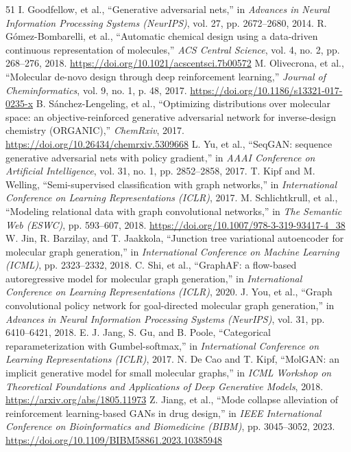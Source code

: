 \documentclass[10pt,a4paper]{article}
\begin{document}
\begin{thebibliography}{51}
 I. Goodfellow, et al., ``Generative adversarial nets,'' in \textit{Advances in Neural Information Processing Systems (NeurIPS)}, vol. 27, pp. 2672--2680, 2014.
 R. G\'omez-Bombarelli, et al., ``Automatic chemical design using a data-driven continuous representation of molecules,'' \textit{ACS Central Science}, vol. 4, no. 2, pp. 268--276, 2018. \url{https://doi.org/10.1021/acscentsci.7b00572}
 M. Olivecrona, et al., ``Molecular de-novo design through deep reinforcement learning,'' \textit{Journal of Cheminformatics}, vol. 9, no. 1, p. 48, 2017. \url{https://doi.org/10.1186/s13321-017-0235-x}
 B. S\'anchez-Lengeling, et al., ``Optimizing distributions over molecular space: an objective-reinforced generative adversarial network for inverse-design chemistry (ORGANIC),'' \textit{ChemRxiv}, 2017. \url{https://doi.org/10.26434/chemrxiv.5309668}
 L. Yu, et al., ``SeqGAN: sequence generative adversarial nets with policy gradient,'' in \textit{AAAI Conference on Artificial Intelligence}, vol. 31, no. 1, pp. 2852--2858, 2017.
 T. Kipf and M. Welling, ``Semi-supervised classification with graph networks,'' in \textit{International Conference on Learning Representations (ICLR)}, 2017.
 M. Schlichtkrull, et al., ``Modeling relational data with graph convolutional networks,'' in \textit{The Semantic Web (ESWC)}, pp. 593--607, 2018. \url{https://doi.org/10.1007/978-3-319-93417-4_38}
 W. Jin, R. Barzilay, and T. Jaakkola, ``Junction tree variational autoencoder for molecular graph generation,'' in \textit{International Conference on Machine Learning (ICML)}, pp. 2323--2332, 2018.
 C. Shi, et al., ``GraphAF: a flow-based autoregressive model for molecular graph generation,'' in \textit{International Conference on Learning Representations (ICLR)}, 2020.
 J. You, et al., ``Graph convolutional policy network for goal-directed molecular graph generation,'' in \textit{Advances in Neural Information Processing Systems (NeurIPS)}, vol. 31, pp. 6410--6421, 2018.
 E. J. Jang, S. Gu, and B. Poole, ``Categorical reparameterization with Gumbel-softmax,'' in \textit{International Conference on Learning Representations (ICLR)}, 2017.
 N. De Cao and T. Kipf, ``MolGAN: an implicit generative model for small molecular graphs,'' in \textit{ICML Workshop on Theoretical Foundations and Applications of Deep Generative Models}, 2018. \url{https://arxiv.org/abs/1805.11973}
 Z. Jiang, et al., ``Mode collapse alleviation of reinforcement learning-based GANs in drug design,'' in \textit{IEEE International Conference on Bioinformatics and Biomedicine (BIBM)}, pp. 3045--3052, 2023. \url{https://doi.org/10.1109/BIBM58861.2023.10385948}

\end{thebibliography}
\end{document}
